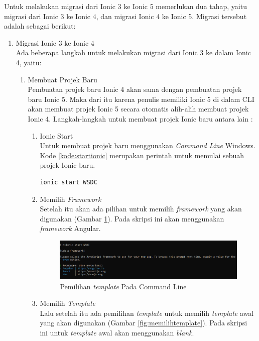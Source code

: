 Untuk melakukan migrasi dari Ionic 3 ke Ionic 5 memerlukan dua tahap, yaitu migrasi dari Ionic 3 ke Ionic 4, dan migrasi Ionic 4 ke Ionic 5. Migrasi tersebut adalah sebagai berikut:

\begin{enumerate}
	\item Migrasi Ionic 3 ke Ionic 4 \\
	Ada beberapa langkah untuk melakukan migrasi dari Ionic 3 ke dalam Ionic 4, yaitu:
	
	\begin{enumerate}
		\item Membuat Projek Baru \\
		Pembuatan projek baru Ionic 4 akan sama dengan pembuatan projek baru Ionic 5. Maka dari itu karena penulis memiliki Ionic 5 di dalam CLI akan membuat projek Ionic 5 secara otomatis alih-alih membuat projek Ionic 4. Langkah-langkah untuk membuat projek Ionic baru antara lain :
		\begin{enumerate}
			\item Ionic Start \\
			Untuk membuat projek baru menggunakan {\it Command Line} Windows. Kode \ref{kode:startionic} merupakan perintah untuk memulai sebuah projek Ionic baru.
			\begin{lstlisting}[language=bash, label=kode:startionic]
			  ionic start WSDC
			\end{lstlisting} 
			\item Memilih {\it Framework} \\
			Setelah itu akan ada pilihan untuk memilih {\it framework} yang akan digunakan (Gambar \ref{fig:memilihframework}). Pada skripsi ini akan menggunakan {\it framework} Angular.
			\begin{figure}[H]
			    \centering
			    \includegraphics[scale=0.6]{Gambar/ssmemilhframework.png}
			    \caption{Pemilihan {\it template} Pada Command Line}
			    \label{fig:memilihframework}
			\end{figure}			
			\newpage
			\item Memilih {\it Template} \\
			Lalu setelah itu ada pemilihan {\it template} untuk memilih {\it template} awal yang akan digunakan (Gambar \ref{fig:memilihtemplate}). Pada skripsi ini untuk {\it template} awal akan menggunakan {\it blank}.

\end{enumerate}
\end{enumerate}
\end{enumerate}
